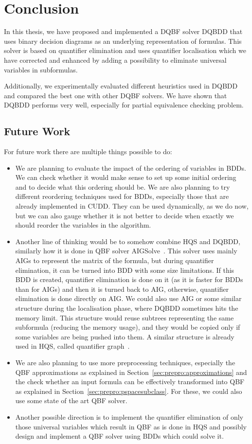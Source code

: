 \documentclass[
  digital, %
  color,
  twoside, %
  table,   %
  nolof,     %
  nolot,     %
]{fithesis3}
\theoremstyle{definition}
\theoremstyle{remark}
\begin{document}
\chapter{Conclusion}
In this thesis, we have proposed and implemented a DQBF solver DQBDD that uses binary decision diagrams as an underlying representation of formulas. This solver is based on quantifier elimination and uses quantifier localisation which we have corrected and enhanced by adding a possibility to eliminate universal variables in subformulas.

Additionally, we experimentally evaluated different heuristics used in DQBDD and compared the best one with other DQBF solvers. We have shown that DQBDD performs very well, especially for partial equivalence checking problem.

\section{Future Work}

For future work there are multiple things possible to do:
\begin{itemize}
  \item We are planning to evaluate the impact of the ordering of variables in BDDs. We can check whether it would make sense to set up some initial ordering and to decide what this ordering should be. We are also planning to try different reordering techniques used for BDDs, especially those that are already implemented in CUDD. They can be used dynamically, as we do now, but we can also gauge whether it is not better to decide when exactly we should reorder the variables in the algorithm.
  \item Another line of thinking would be to somehow combine HQS and DQBDD, similarly how it is done in QBF solver AIGSol\-ve~\cite{AIGSolve}. This solver uses mainly AIGs to represent the matrix of the formula, but during quantifier elimination, it can be turned into BDD with some size limitations. If this BDD is created, quantifier elimination is done on it (as it is faster for BDDs than for AIGs) and then it is turned back to AIG, otherwise, quantifier elimination is done directly on AIG. We could also use AIG or some similar structure during the localisation phase, where DQBDD sometimes hits the memory limit. This structure would reuse subtrees representing the same subformula (reducing the memory usage), and they would be copied only if some variables are being pushed into them. A similar structure is already used in HQS, called quantifier graph~\cite{HQSquantifierLocalisation}.
  \item We are also planning to use more preprocessing techniques, especially the QBF approximations as explained in Section~\ref{sec:prepro:approximations} and the check whether an input formula can be effectively transformed into QBF as explained in Section~\ref{sec:prepro:pspacesubclass}. For these, we could also use some state of the art QBF solver.
  \item Another possible direction is to implement the quantifier elimination of only those universal variables which result in QBF as is done in HQS and possibly design and implement a QBF solver using BDDs which could solve it.
\end{itemize}
\end{document}
